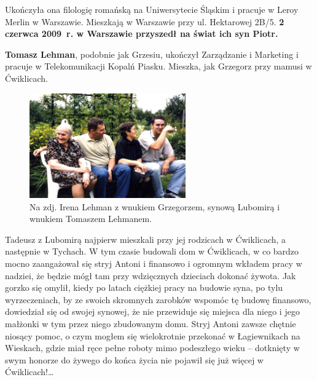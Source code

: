 Ukończyła ona filologię romańską na Uniwersytecie Śląskim i pracuje w Leroy Merlin w Warszawie. Mieszkają w Warszawie przy ul. Hektarowej 2B/5.
\textbf{2 czerwca 2009~r. w Warszawie przyszedł na świat ich syn Piotr.}

\textbf{Tomasz Lehman}, podobnie jak Grzesiu, ukończył Zarządzanie i Marketing i pracuje w Telekomunikacji Kopalń Piasku. Mieszka, jak Grzegorz przy mamusi w Ćwiklicach. 

\begin{figure}[!h]
\begin{center}
\includegraphics[width=0.6\textwidth]{photo/grzegorz_tomasz_lehman.jpg}
\caption[Irena Lehman z wnukiem Grzegorzem, synową Lubomirą i wnukiem Tomaszem Lehmanem]{Na zdj. Irena Lehman z wnukiem Grzegorzem, synową Lubomirą i wnukiem Tomaszem Lehmanem.}
\label{rys:grzegorz_tomasz_lehman}
\end{center}
\end{figure}

Tadeusz z Lubomirą najpierw mieszkali przy jej rodzicach w Ćwiklicach, a następnie w Tychach. W tym czasie budowali dom w Ćwiklicach, w co bardzo mocno zaangażował się stryj Antoni i finansowo i ogromnym wkładem pracy w nadziei, że będzie mógł tam przy wdzięcznych dzieciach dokonać żywota. Jak gorzko się omylił, kiedy po latach ciężkiej pracy na budowie syna, po tylu wyrzeczeniach, by ze swoich skromnych zarobków wspomóc tę budowę finansowo, dowiedział się od swojej synowej, że nie przewiduje się miejsca dla niego i jego małżonki w tym przez niego zbudowanym domu. Stryj Antoni zawsze chętnie niosący pomoc, o czym mogłem się wielokrotnie przekonać w Łagiewnikach na Wieskach, gdzie miał ręce pełne roboty mimo podeszłego wieku -- dotknięty w swym honorze do żywego do końca życia nie pojawił się już więcej w Ćwiklicach!\ldots


